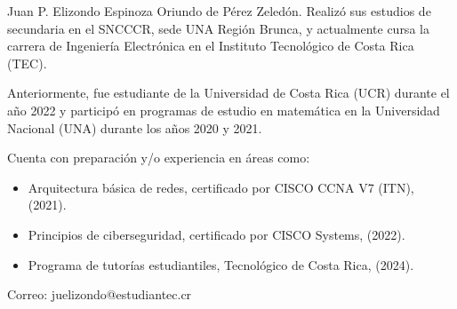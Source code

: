 \documentclass[journal]{IEEEtran}
\begin{document}
\begin{IEEEbiographynophoto}{Juan P. Elizondo Espinoza}
        Oriundo de Pérez Zeledón. Realizó sus estudios de secundaria en el SNCCCR, sede UNA Región Brunca, y actualmente cursa la carrera de Ingeniería Electrónica en el Instituto Tecnológico de Costa Rica (TEC). 
        
        Anteriormente, fue estudiante de la Universidad de Costa Rica (UCR) durante el año 2022 y participó en programas de estudio en matemática en la Universidad Nacional (UNA) durante los años 2020 y 2021. 
        
        Cuenta con preparación y/o experiencia en áreas como:
        \begin{itemize}
            \item Arquitectura básica de redes, certificado por CISCO CCNA V7 (ITN), (2021).
            \item Principios de ciberseguridad, certificado por CISCO Systems, (2022).
            \item Programa de tutorías estudiantiles, Tecnológico de Costa Rica, (2024).
        \end{itemize}
        
        Correo: juelizondo@estudiantec.cr
\end{IEEEbiographynophoto}



\end{document}

